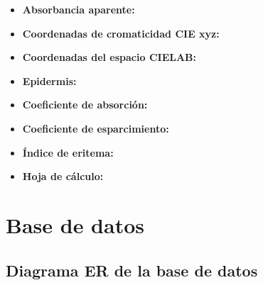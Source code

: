 \begin{itemize}
	\item \textbf{Absorbancia aparente: }
	
	\item \textbf{Coordenadas de cromaticidad CIE xyz: }
	
	\item \textbf{Coordenadas del espacio CIELAB: }
	
	\item \textbf{Epidermis: }	
	
	\item \textbf{Coeficiente de absorci\'{o}n: }
	
	\item \textbf{Coeficiente de esparcimiento: }
	
	\item \textbf{\'{I}ndice de eritema: }
	
	\item \textbf{Hoja de c\'{a}lculo: }
	
\end{itemize}

\newpage

\section{Base de datos}

	\subsection{Diagrama ER de la base de datos}

